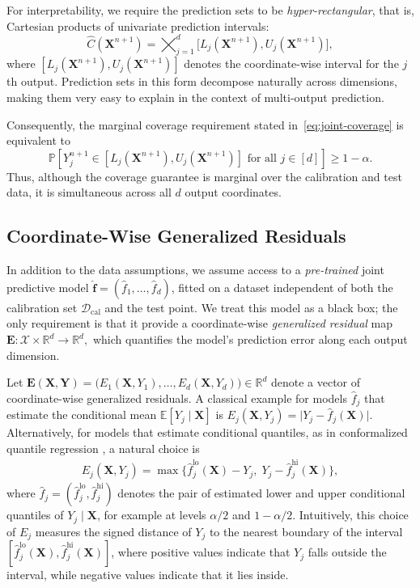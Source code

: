 For interpretability, we require the prediction sets to be \emph{hyper-rectangular}, that is, Cartesian products of univariate prediction intervals:
\begin{equation} \label{eq:rectangle}
\hat{C}(\mathbf{X}^{n+1}) 
= \bigtimes_{j=1}^d 
\bigl[ L_j(\mathbf{X}^{n+1}), 
       U_j(\mathbf{X}^{n+1}) \bigr],
     \end{equation}
where $[L_j(\mathbf{X}^{n+1}), U_j(\mathbf{X}^{n+1})]$ denotes the coordinate-wise interval for the $j$th output.  
Prediction sets in this form decompose naturally across dimensions, making them very easy to explain in the context of multi-output prediction.  
{\color{blue}Consequently, the marginal coverage
requirement stated in~\eqref{eq:joint-coverage} is equivalent to
\[
\mathbb P\left[
    {Y}_j^{n+1}\in
    [L_j(\mathbf{X}^{n+1}),U_j(\mathbf{X}^{n+1})]
    \text{ for all }j\in[d]
\right]
\geq 1-\alpha.
\]
Thus, although the coverage guarantee is marginal over the calibration and test
data, it is simultaneous across all $d$ output coordinates.


\subsection{Coordinate-Wise Generalized Residuals} \label{sec:residuals}

In addition to the data assumptions, we assume access to a \emph{pre-trained} joint predictive model $\hat{\mathbf f} = (\hat{f}_1,\ldots,\hat{f}_d)$, fitted on a dataset independent of both the calibration set $\mathcal{D}_{\mathrm{cal}}$ and the test point. 
We treat this model as a black box; the only requirement is that it provide a coordinate-wise \emph{generalized residual} map $\mathbf E : \mathcal{X} \times \mathbb{R}^d \to \mathbb{R}^d,$
which quantifies the model's prediction error along each output dimension.

Let
$\mathbf E(\mathbf X,\mathbf Y)
=
\bigl(
E_1(\mathbf X,Y_1),\ldots,E_d(\mathbf X,Y_d)
\bigr)
\in\mathbb R^d$
denote a vector of coordinate-wise generalized residuals.
A classical example for models $\hat{f}_j$ that estimate the conditional mean $\mathbb{E}[Y_j\mid\mathbf X]$ \citep{lei2018distribution} is $E_j(\mathbf X,Y_j) = \lvert Y_j - \hat{f}_j(\mathbf X) \rvert$.
Alternatively, for models that estimate conditional quantiles, as in conformalized quantile regression \citep{romano2019conformalized}, a natural choice is
\begin{align*}
E_j(\mathbf X,Y_j) = \max \bigl\{\hat{f}_j^{\mathrm{lo}}(\mathbf X) - Y_j,\; Y_j - \hat{f}_j^{\mathrm{hi}}(\mathbf X)\bigr\},
\end{align*}
where $\hat{f}_j = (\hat{f}_j^{\mathrm{lo}}, \hat{f}_j^{\mathrm{hi}})$ denotes the pair of estimated lower and upper conditional quantiles of $Y_j\mid \mathbf X$, for example at levels $\alpha/2$ and $1-\alpha/2$. Intuitively, this choice of $E_j$ measures the signed distance of $Y_j$ to the nearest boundary of the interval $[\hat{f}_j^{\mathrm{lo}}(\mathbf X), \hat{f}_j^{\mathrm{hi}}(\mathbf X)]$, where
positive values indicate that $Y_j$ falls outside the interval, while negative values indicate that it lies inside.

}
